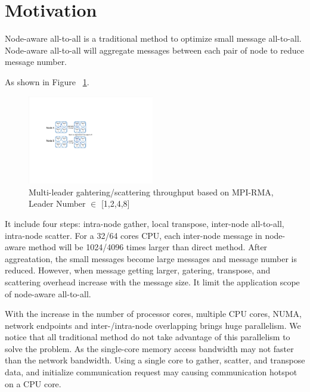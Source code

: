 \section {Motivation}

Node-aware all-to-all is a traditional method to optimize small message all-to-all.
Node-aware all-to-all will aggregate messages between each pair of node to reduce message number.

As shown in Figure ~\ref{Node-aware-alltoall}.
\begin{figure}[!htb]
  \centering
    \includegraphics[width=0.49\textwidth]{./Figures/Node-aware-alltoall.pdf}
  \caption{Multi-leader gahtering/scattering throughput based on MPI-RMA, Leader Number $\in$ [1,2,4,8]}
	\label{Node-aware-alltoall}
	\vspace{0.2in}
\end{figure}

It include four steps: intra-node gather, local transpose, inter-node all-to-all, intra-node scatter.
For a 32/64 cores CPU, each inter-node message in node-aware method will be 1024/4096 times larger than direct method.
After aggreatation, the small messages become large messages and message number is reduced.
However, when message getting larger, gatering, transpose, and scattering overhead increase with the message size.
It limit the application scope of node-aware all-to-all.

With the increase in the number of processor cores, multiple CPU cores, NUMA, network endpoints and inter-/intra-node overlapping brings huge parallelism.
We notice that all traditional method do not take advantage of this parallelism to solve the problem.
As the single-core memory access bandwidth may not faster than the network bandwidth.
Using a single core to gather, scatter, and transpose data, and initialize communication request may causing communication hotspot on a CPU core.

